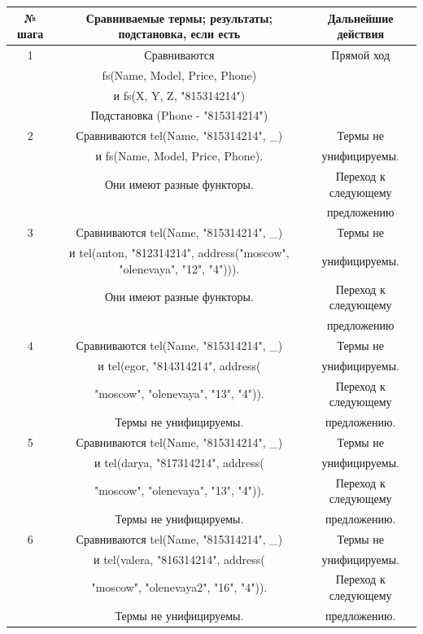 \documentclass[12pt]{report}
\begin{document}
\begin{table}[H]
	\begin{center}
		\begin{tabular}{|c c c |} 
			\hline
			№ шага & Сравниваемые термы; результаты; подстановка, если есть & Дальнейшие действия \\  
			\hline
			1 & Сравниваются & Прямой ход \\
			  & fs(Name, Model, Price, Phone) & \\
			  & и fs(X, Y, Z, "815314214")  & \\
			  & Подстановка (Phone - "815314214") &\\
			\hline
			2 & Сравниваются tel(Name, "815314214", \_) & Термы не \\
			  & и fs(Name, Model, Price, Phone). & унифицируемы. \\
			  & Они имеют разные функторы. &Переход к следующему \\
			  & & предложению\\
			\hline
			3 & Сравниваются tel(Name, "815314214", \_) & Термы не \\
			  & и tel(anton, "812314214", address("moscow", "olenevaya", "12", "4"))). & унифицируемы. \\
			  & Они имеют разные функторы. & Переход к следующему \\
			  & & предложению\\
			\hline
			4 & Сравниваются tel(Name, "815314214", \_) & Термы не \\
			  & и tel(egor, "814314214", address( & унифицируемы. \\
		      & "moscow", "olenevaya", "13", "4")).  & Переход к следующему \\
			  & Термы не унифицируемы. & предложению. \\
			\hline
			5 & Сравниваются tel(Name, "815314214", \_) & Термы не \\
			  & и tel(darya, "817314214", address( & унифицируемы. \\
		      & "moscow", "olenevaya", "13", "4")).  & Переход к следующему \\
			  & Термы не унифицируемы. & предложению. \\
			\hline
		    6 & Сравниваются tel(Name, "815314214", \_) & Термы не \\
			  & и tel(valera, "816314214", address( & унифицируемы. \\
			  & "moscow", "olenevaya2", "16", "4")).  & Переход к следующему \\
			  & Термы не унифицируемы. & предложению. \\

\end{tabular}
\end{center}
\end{table}
\end{document}
